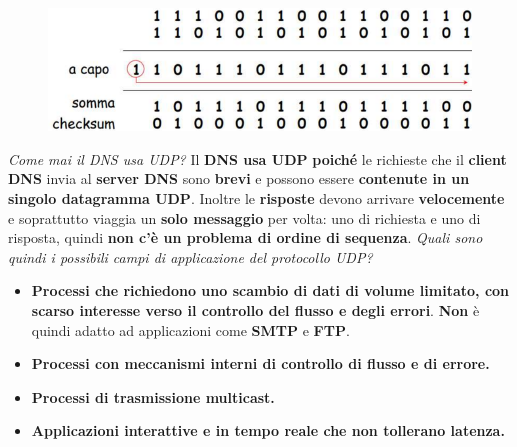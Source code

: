 \documentclass[11pt,a4paper]{article}
\theoremstyle{definition}
\begin{document}
\begin{figure}[!h]
	\includegraphics[scale=0.2]{Immagini/Checksum.png}
	\centering
\end{figure}
\textit{Come mai il DNS usa UDP?}\newline\newline
Il \textbf{DNS usa UDP} \textbf{poiché} le richieste che il \textbf{client DNS} invia al \textbf{server DNS} sono \textbf{brevi} e possono essere \textbf{contenute in un singolo datagramma UDP}. Inoltre le \textbf{risposte} devono arrivare \textbf{velocemente} e soprattutto viaggia un \textbf{solo messaggio} per volta: uno di richiesta e uno di risposta, quindi \textbf{non c'è un problema di ordine di sequenza}.\newline\newline
\textit{Quali sono quindi i possibili campi di applicazione del protocollo UDP?}
\begin{itemize}
	\item \textbf{Processi che richiedono uno scambio di dati di volume limitato, con scarso interesse verso il controllo del flusso e degli errori}. \textbf{Non} è quindi adatto ad applicazioni come \textbf{SMTP} e \textbf{FTP}.
	\item \textbf{Processi con meccanismi interni di controllo di flusso e di errore.}
	\item \textbf{Processi di trasmissione multicast.}
	\item \textbf{Applicazioni interattive e in tempo reale che non tollerano latenza.}
\end{itemize}
\newpage
\end{document}
